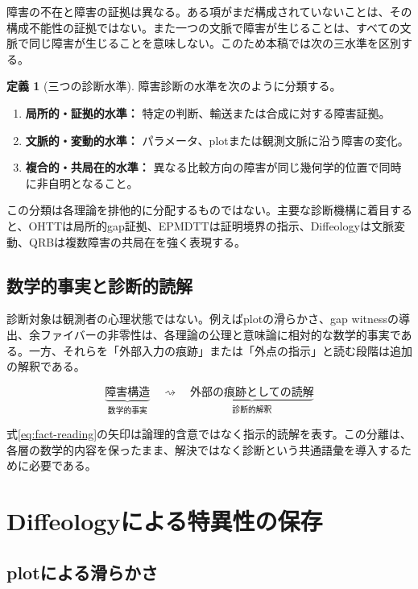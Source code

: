 \documentclass[a4paper,11pt]{ltjsarticle}
\theoremstyle{definition}
\newtheorem{definition}{定義}[section]
\theoremstyle{plain}
\begin{document}
障害の不在と障害の証拠は異なる。ある項がまだ構成されていないことは、その構成不能性の証拠ではない。また一つの文脈で障害が生じることは、すべての文脈で同じ障害が生じることを意味しない。このため本稿では次の三水準を区別する。

\begin{definition}[三つの診断水準]
障害診断の水準を次のように分類する。
\begin{enumerate}
 \item \textbf{局所的・証拠的水準：} 特定の判断、輸送または合成に対する障害証拠。
 \item \textbf{文脈的・変動的水準：} パラメータ、plotまたは観測文脈に沿う障害の変化。
 \item \textbf{複合的・共局在的水準：} 異なる比較方向の障害が同じ幾何学的位置で同時に非自明となること。
\end{enumerate}
\end{definition}

この分類は各理論を排他的に分配するものではない。主要な診断機構に着目すると、OHTTは局所的gap証拠、EPMDTTは証明境界の指示、Diffeologyは文脈変動、QRBは複数障害の共局在を強く表現する。

\subsection{数学的事実と診断的読解}

診断対象は観測者の心理状態ではない。例えばplotの滑らかさ、gap witnessの導出、余ファイバーの非零性は、各理論の公理と意味論に相対的な数学的事実である。一方、それらを「外部入力の痕跡」または「外点の指示」と読む段階は追加の解釈である。

\begin{equation}
 \underbrace{\text{障害構造}}_{\text{数学的事実}}
 \quad\rightsquigarrow\quad
 \underbrace{\text{外部の痕跡としての読解}}_{\text{診断的解釈}}
 \label{eq:fact-reading}
\end{equation}

式\eqref{eq:fact-reading}の矢印は論理的含意ではなく指示的読解を表す。この分離は、各層の数学的内容を保ったまま、解決ではなく診断という共通語彙を導入するために必要である。

\section{Diffeologyによる特異性の保存}

\subsection{plotによる滑らかさ}
\end{document}
